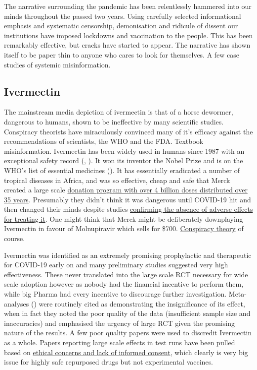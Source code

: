 \documentclass[11pt,a4paper]{article}
\begin{document}
The narrative surrounding the pandemic has been relentlessly hammered into our minds throughout the passed two years. Using carefully selected informational emphasis and systematic censorship, demonisation and ridicule of dissent our institutions have imposed lockdowns and vaccination to the people. This has been remarkably effective, but cracks have started to appear. The narrative has shown itself to be paper thin to anyone who cares to look for themselves. A few case studies of systemic misinformation.

\subsection*{Ivermectin}

The mainstream media depiction of ivermectin is that of a horse dewormer, dangerous to humans, shown to be ineffective by many scientific studies. Conspiracy theorists have miraculously convinced many of it’s efficacy against the recommendations of scientists, the WHO and the FDA. Textbook misinformation. Ivermectin has been widely used in humans since 1987 with an exceptional safety record (\cite{Smit2016-fq}, \cite{Crump2011-ev}). It won its inventor the Nobel Prize and is on the WHO’s list of essential medicines (\cite{Crump2017-qg}). It has essentially eradicated a number of tropical diseases in Africa, and was so effective, cheap and safe that Merck created a large scale \href{https://www.merck.com/stories/mectizan/}{donation program with over 4 billion doses distributed over 35 years}. Presumably they didn't think it was dangerous until COVID-19 hit and then changed their minds despite studies \href{https://academic.oup.com/ofid/article/8/Supplement_1/S365/6450290}{confirming the absence of adverse effects for treating it}. One might think that Merck might be deliberately downplaying Ivermectin in favour of Molnupiravir which sells  for \$700. \href{https://www.bloomberg.com/news/articles/2021-12-08/merck-s-mrk-covid-pill-must-first-overcome-anti-vax-ivermectin-misinformation}{Conspiracy theory} of course.

Ivermectin was identified as an extremely promising prophylactic and therapeutic for COVID-19 early on and many preliminary studies suggested very high effectiveness. These never translated into the large scale RCT necessary for wide scale adoption however as nobody had the financial incentive to perform them, while big Pharma had every incentive to discourage further investigation. Meta-analyses (\cite{Popp21}) were routinely cited as demonstrating the insignificance of its effect, when in fact they noted the poor quality of the data (insufficient sample size and inaccuracies) and emphasised the urgency of large RCT given the promising nature of the results. A few poor quality papers were used to discredit Ivermectin as a whole. Papers reporting large scale effects in test runs have been pulled based on \href{https://healthpolicy-watch.news/mexico-city-officials-in-row-over-misleading-paper-to-justify-its-ivermectin-drive/}{ethical concerns and lack of informed consent}, which clearly is very big issue for highly safe repurposed drugs but not experimental vaccines. 
\end{document}
